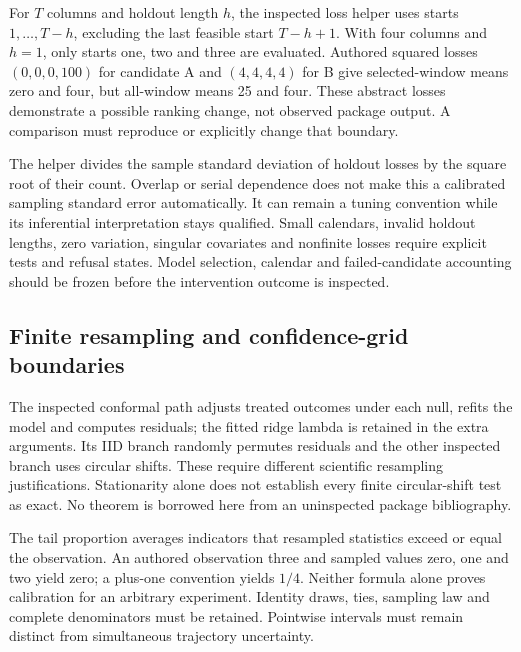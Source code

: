 For $T$ columns and holdout length $h$, the inspected loss helper uses
starts $1,\ldots,T-h$, excluding the last feasible start $T-h+1$.
With four columns and $h=1$, only starts one, two and three are evaluated.
Authored squared losses $(0,0,0,100)$ for candidate A and $(4,4,4,4)$ for B
give selected-window means zero and four, but all-window means 25 and four.
These abstract losses demonstrate a possible ranking change, not observed
package output. A comparison must reproduce or explicitly change that
boundary.~\citep{exec24_augsynth_source,exec24_augsynth_choice}

The helper divides the sample standard deviation of holdout losses by the
square root of their count. Overlap or serial dependence does not make
this a calibrated sampling standard error automatically. It can remain a
tuning convention while its inferential interpretation stays qualified.
Small calendars, invalid holdout lengths, zero variation, singular
covariates and nonfinite losses require explicit tests and refusal states.
Model selection, calendar and failed-candidate accounting should be frozen
before the intervention outcome is inspected.
\citep{exec24_augsynth_source,exec24_augsynth_choice}

\subsection{Finite resampling and confidence-grid boundaries}
The inspected conformal path adjusts treated outcomes under each null,
refits the model and computes residuals; the fitted ridge lambda is retained
in the extra arguments. Its IID branch randomly permutes residuals and the
other inspected branch uses circular shifts. These require different
scientific resampling justifications. Stationarity alone does not establish
every finite circular-shift test as exact. No theorem is borrowed here from
an uninspected package bibliography.
\citep{exec24_augsynth_source,exec24_augsynth_choice}

The tail proportion averages indicators that resampled statistics exceed
or equal the observation. An authored observation three and sampled values
zero, one and two yield zero; a plus-one convention yields $1/4$. Neither
formula alone proves calibration for an arbitrary experiment. Identity draws,
ties, sampling law and complete denominators must be retained. Pointwise
intervals must remain distinct from simultaneous trajectory uncertainty.
\citep{exec24_augsynth_source,exec24_augsynth_choice}

